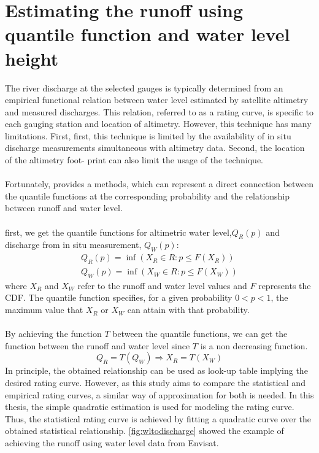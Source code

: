 \section{Estimating the runoff using quantile function and water level height}\label{sec:waterlevel}
The river discharge at the selected gauges is typically determined from an empirical functional relation between water level estimated by satellite altimetry and measured discharges. This relation, referred to as a rating curve, is specific to each gauging station and location of altimetry. However, this technique has many limitations. First, first, this technique is limited by the availability of in situ discharge measurements simultaneous with altimetry data. Second, the location of the altimetry foot- print can also limit the usage of the technique.\\\\
Fortunately, \cite{tourian2013quantile} provides a methods, which can represent a direct connection between the quantile functions at the corresponding probability and the relationship between runoff and water level. \\\\
first, we get the quantile functions for altimetric water level,$Q_R(p)$ and discharge from in situ measurement, $Q_W(p)$:
\begin{gather*}
	Q_R(p) = \inf(X_R \in R: p\leq F(X_R)) \\
	Q_W(p) = \inf(X_W \in R: p\leq F(X_W)) 
\end{gather*}
where $X_R$ and $X_W$ refer to the runoff and water level values and $F$ represents the CDF. The quantile function specifies, for a given probability $0 < p < 1$, the maximum value that $X_R$ or $X_W$ can attain with that probability.\\\\
By achieving the function $T$ between the quantile functions, we can get the function between the runoff and water level since $T$ is a non decreasing function. 
\begin{equation}
	Q_R = T(Q_W) \Longrightarrow X_R = T(X_W)
\end{equation}
In principle, the obtained relationship can be used as look-up table implying the desired rating curve. However, as this study aims to compare the statistical and empirical rating curves, a similar way of approximation for both is needed. In this thesis, the simple quadratic estimation is used for modeling the rating curve. Thus, the statistical rating curve is achieved by fitting a quadratic curve over the obtained statistical relationship. \ref{fig:wltodischarge} showed the example of achieving the runoff using water level data from Envisat. 

